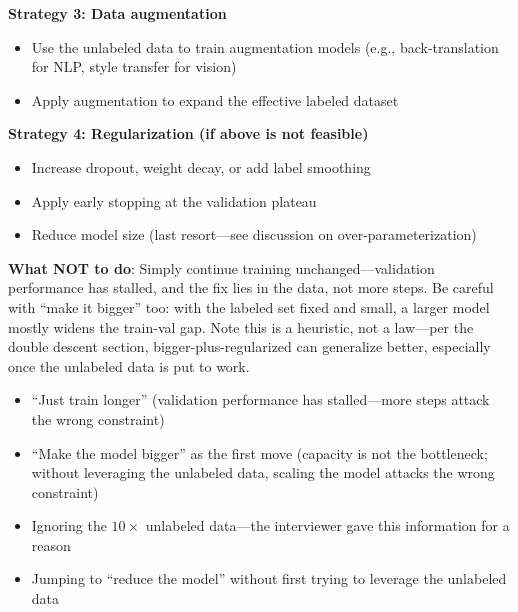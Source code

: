 \begin{interviewq}
\textbf{Strategy 3: Data augmentation}
\begin{itemize}
    \item Use the unlabeled data to train augmentation models (e.g., back-translation for NLP, style transfer for vision)
    \item Apply augmentation to expand the effective labeled dataset
\end{itemize}

\textbf{Strategy 4: Regularization (if above is not feasible)}
\begin{itemize}
    \item Increase dropout, weight decay, or add label smoothing
    \item Apply early stopping at the validation plateau
    \item Reduce model size (last resort---see discussion on over-parameterization)
\end{itemize}

\textbf{What NOT to do}: Simply continue training unchanged---validation performance has stalled, and the fix lies in the data, not more steps. Be careful with ``make it bigger'' too: with the labeled set fixed and small, a larger model mostly widens the train-val gap. Note this is a heuristic, not a law---per the double descent section, bigger-plus-regularized can generalize better, especially once the unlabeled data is put to work.

\redflags
\begin{itemize}
    \item ``Just train longer'' (validation performance has stalled---more steps attack the wrong constraint)
    \item ``Make the model bigger'' as the first move (capacity is not the bottleneck; without leveraging the unlabeled data, scaling the model attacks the wrong constraint)
    \item Ignoring the $10\times$ unlabeled data---the interviewer gave this information for a reason
    \item Jumping to ``reduce the model'' without first trying to leverage the unlabeled data
\end{itemize}



\end{interviewq}
